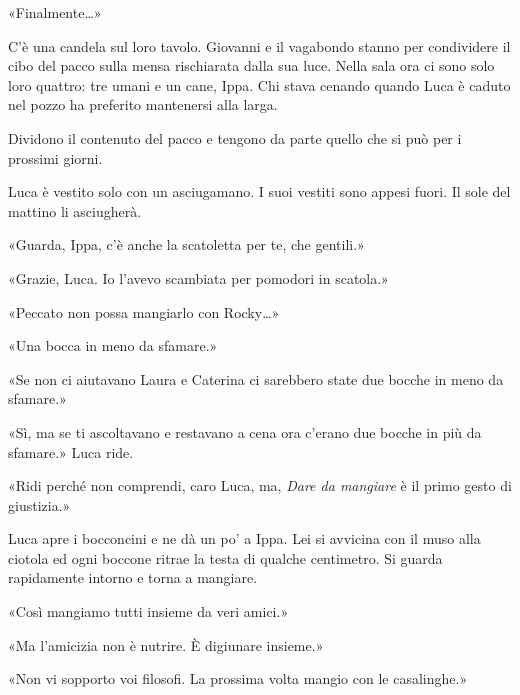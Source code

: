 \documentclass[10pt,oneside]{extbook}
\begin{document}
«Finalmente…»

\par\medskip
C’\`e una candela sul loro tavolo. Giovanni e il vagabondo stanno per condividere il cibo del pacco sulla mensa rischiarata dalla sua luce.
Nella sala ora ci sono solo loro quattro: tre umani e un cane, Ippa.
Chi stava cenando quando Luca \`e caduto nel pozzo ha preferito mantenersi alla larga.

\par\medskip
Dividono il contenuto del pacco e tengono da parte quello che si pu\`o per i prossimi giorni.

\par\medskip
Luca \`e vestito solo con un asciugamano. I suoi vestiti sono appesi fuori.  
Il sole del mattino li asciugherà.

\par\medskip
«Guarda, Ippa, c’\`e anche la scatoletta per te, che gentili.»

\par\medskip
«Grazie, Luca. Io l’avevo scambiata per pomodori in scatola.»

\par\medskip
«Peccato non possa mangiarlo con Rocky…»

\par\medskip
«Una bocca in meno da sfamare.»

\par\medskip
«Se non ci aiutavano Laura e Caterina ci sarebbero state due bocche in meno da sfamare.»

\par\medskip
«Sì, ma se ti ascoltavano e restavano a cena ora c’erano due bocche in pi\`u da sfamare.»  
Luca ride.

\par\medskip
«Ridi perch\'e non comprendi, caro Luca, ma, \textit{Dare da mangiare} \`e il primo gesto di giustizia.»

\par\medskip
Luca apre i bocconcini e ne dà un po’ a Ippa.  
Lei si avvicina con il muso alla ciotola ed ogni boccone ritrae la testa di qualche centimetro.  
Si guarda rapidamente intorno e torna a mangiare.  


\par\medskip
«Così mangiamo tutti insieme da veri amici.»

\par\medskip
«Ma l’amicizia non \`e nutrire. \`E digiunare insieme.»

\par\medskip
«Non vi sopporto voi filosofi. La prossima volta mangio con le casalinghe.»
\end{document}
